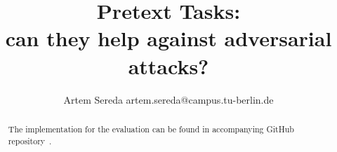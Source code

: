 \documentclass[12pt]{extarticle}
\title{
    Pretext Tasks: \\
    can they help against adversarial attacks?
}
\author{Artem Sereda artem.sereda@campus.tu-berlin.de}
\begin{document}
    \maketitle

    \begin{abstract}
    The implementation for the evaluation can be found in accompanying GitHub repository~\cite{github}.
    \end{abstract}


    
    
    


    \printbibliography
\end{document}
